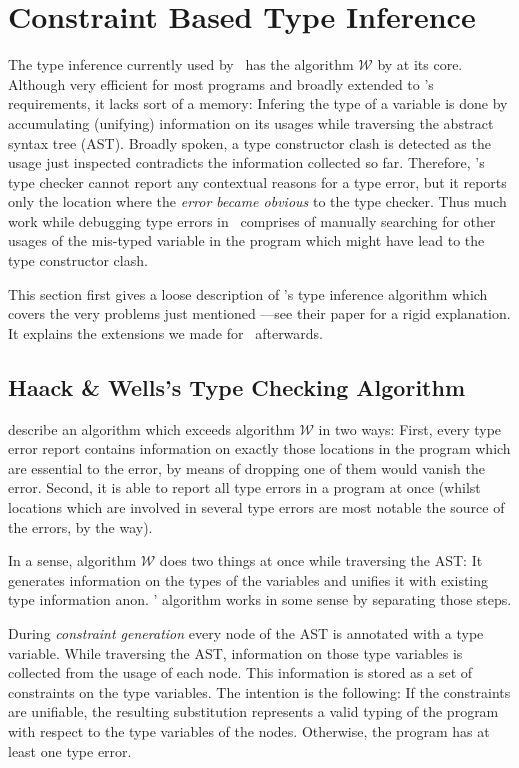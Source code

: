 
\section{Constraint Based Type Inference}
\label{sec:typeinfer}

The type inference currently used by \ocaml\ has the algorithm $\mathcal W$ by
\citet{damasmilner} at its core.
Although very efficient for most programs and broadly extended to \ocaml's 
requirements, it lacks sort of a memory:
Infering the type of a variable is done by accumulating (unifying) information
on its usages while traversing the abstract syntax tree (AST).
Broadly spoken, a type constructor clash is detected as the usage just
inspected contradicts the information collected so far.
Therefore, \ocaml's type checker cannot report any contextual reasons for a type
error, but it reports only the location where the \emph{error became obvious} to
the type checker.
Thus much work while debugging type errors in \ocaml\ comprises of manually
searching for other usages of the mis-typed variable in the program which might
have lead to the type constructor clash.

This section first gives a loose description of \citeauthor{haackwells04}'s type
inference algorithm which covers the very problems just mentioned
---see their \citeyear{haackwells04} paper for a rigid explanation.
It explains the extensions we made for \easyocaml\ afterwards.

\subsection{Haack \& Wells's Type Checking Algorithm}

\citet{haackwells04} describe an algorithm which exceeds algorithm $\mathcal W$
in two ways:
First, every type error report contains information on exactly those
locations in the program which are essential to the error, by means of dropping
one of them would vanish the error.
Second, it is able to report all type errors in a program at once (whilst
locations which are involved in several type errors are most notable the source
of the errors, by the way).

In a sense, algorithm $\mathcal W$ does two things at once while traversing the 
AST: It generates information on the types of the variables and unifies it with
existing type information anon.  \citeauthor{haackwells04}' algorithm works in
some sense by separating those steps.

During \emph{constraint generation} every node of the AST is annotated with
a type variable. While traversing the AST, information on those type variables
is collected from the usage of each node. This information is stored as a set of
constraints on the type variables.
The intention is the following: If the constraints are unifiable, the resulting
substitution represents a valid typing of the program with respect to the type
variables of the nodes.
Otherwise, the program has at least one type error.

